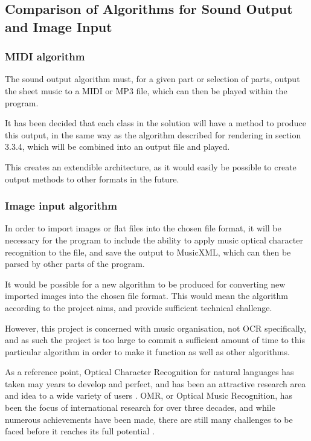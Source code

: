 \subsection{Comparison of Algorithms for Sound Output and Image Input}
\subsubsection{MIDI algorithm}
The sound output algorithm must, for a given part or selection of parts, output the sheet music to a MIDI or MP3 file, which can then be played within the program. 

It has been decided that each class in the solution will have a method to produce this output, in the same way as the algorithm described for rendering in section 3.3.4, which will be combined into an output file and played.

This creates an extendible architecture, as it would easily be possible to create output methods to other formats in the future.

\subsubsection{Image input algorithm}
In order to import images or flat files into the chosen file format, it will be necessary for the program to include the ability to apply music optical character recognition to the file, and save the output to MusicXML, which can then be parsed by other parts of the program. 

It would be possible for a new algorithm to be produced for converting new imported images into the chosen file format. This would mean the algorithm according to the project aims, and provide sufficient technical challenge.

However, this project is concerned with music organisation, not OCR specifically, and as such the project is too large to commit a sufficient amount of time to this particular algorithm in order to make it function as well as other algorithms. 

As a reference point, Optical Character Recognition for natural languages has taken may years to develop and perfect, and has been an attractive research area and idea to a wide variety of users \parencite{InternationalConf}. OMR, or Optical Music Recognition, has been the focus of international research for over three decades, and while numerous achievements have been made, there are still many challenges to be faced before it reaches its full potential \parencite{musicocr}. 

